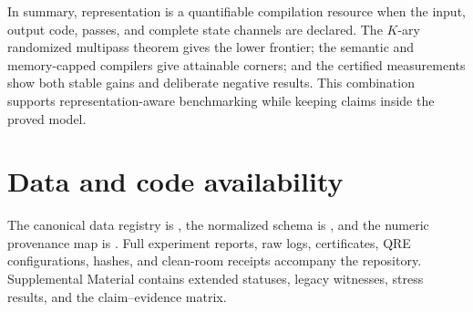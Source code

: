 \documentclass[aps,prx,reprint,floatfix,superscriptaddress]{revtex4-2}
\begin{document}
In summary, representation is a quantifiable compilation resource when the
input, output code, passes, and complete state channels are declared.  The
$K$-ary randomized multipass theorem gives the lower frontier; the semantic
and memory-capped compilers give attainable corners; and the certified
measurements show both stable gains and deliberate negative results.  This
combination supports representation-aware benchmarking while keeping claims
inside the proved model.

\section*{Data and code availability}

The canonical data registry is , the normalized
schema is , and the numeric provenance map
is .  Full experiment reports, raw logs,
certificates, QRE configurations, hashes, and clean-room receipts accompany
the repository.  Supplemental Material contains extended statuses, legacy
witnesses, stress results, and the claim--evidence matrix.


\end{document}
